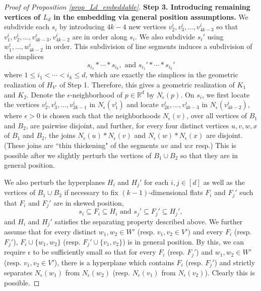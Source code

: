 \documentclass{article}
\newcommand{\RR}{\mathbb{R}}
\theoremstyle{definition}
\begin{document}
\begin{proof}[Proof of Proposition \ref{prop_Ld_embeddable}]
\medskip 

\textbf{Step 3. Introducing remaining vertices of $L_d$ in the embedding via general position assumptions.} 
We subdivide each $s_i$ by introducing $4k-4$ new vertices $v_2^i,  v_3^i, \dots,  v_{4k-3}^i$ so that $v_1^i, v_2^i,  \dots,  v_{4k-3}^i, v_{4k-2}^i$ are  in order along $s_i$. 
We also subdivide $s_i'$ using $w_1^i, \dots, w_{4k-2}^i$ in order. This subdivision of line segments induces a  subdivision of the simplices 
$$s_{i_1}* \cdots * s_{i_k}, \textrm{ and } s_{i_1}'* \cdots * s_{i_k}'$$
where $1 \leq i_1< \cdots < i_k \leq d$, which are exactly the simplices in the geometric realization of $H_{V'}$ of Step 1. Therefore, this gives a geometric realization of $K_1$ and $K_2$. Denote the $\epsilon$-neighborhood of $p \in \RR^d$ by $N_\epsilon(p)$. On $s_i$, we first locate the vertices $v_2^i, v_3^i, \dots, v_{2k-1}^i$  in $N_\epsilon(v_1^i)$ and locate $v_{2k}^i, \dots, v_{4k-3}^i$ in $N_\epsilon(v_{4k-2}^i)$, where $\epsilon>0$ is chosen such that the neighborhoods $N_{\epsilon}(v)$, over all vertices of $B_1$ and  $B_2$, are pairwise disjoint, and further, for every four distinct vertices $u,v,w,x$ of $B_1$ and $B_2$, the joins $N_\epsilon(u)*N_\epsilon(v)$ and $N_\epsilon(w)*N_\epsilon(x)$ are disjoint. (These joins  are ``thin thickening" of the segments $uv$ and $wx$ resp.) 
This is possible after we slightly perturb the vertices of $B_1 \cup B_2$ so that they are in general position.

We also perturb the hyperplanes $H_i$ and $H_j'$ for each $i,j \in [d]$ as well as the vertices of $B_1 \cup B_2$ if necessary to fix $(k-1)$-dimensional flats $F_i$ and $F_j'$  such that 
$F_i$ and $F_j'$ are in skewed position, 
 $$s_i \subseteq F_i \subseteq H_i \textrm{ and } s_j' \subseteq F_j' \subseteq H_j',$$
 and $H_i$ and $H_j'$ satisfies the separating property described above. We further assume that for every distinct $w_1, w_2 \in W'$ (resp. $v_1, v_2 \in V'$) and every $F_i$ (resp. $F_j'$), $F_i \cup \{w_1, w_2\}$ (resp. $F_j' \cup \{v_1, v_2\}$) is in general position. By this, we can require $\epsilon$ to be sufficiently small so that for every $F_i$ (resp. $F_j'$) and $w_1, w_2 \in W'$ (resp. $v_1, v_2 \in V'$), there is a hyperplane which contains $F_i$ (resp. $F_j'$) and strictly separates $N_\epsilon(w_1)$ from $N_\epsilon(w_2)$ (resp. $N_\epsilon(v_1)$ from $N_\epsilon(v_2)$).  Clearly this is possible. 



\end{proof}
\end{document}
